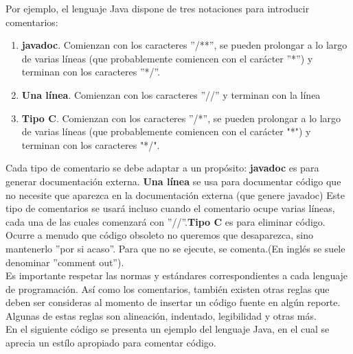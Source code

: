 Por ejemplo, el lenguaje Java dispone de tres notaciones para introducir comentarios:\\

\begin{enumerate}[1)]
	\item \textbf{javadoc}. Comienzan con los caracteres ''/**'', se pueden prolongar a lo largo de varias l\'ineas (que probablemente comiencen con el car\'acter ''*'') y terminan con los caracteres ''*/''.
	
	\item \textbf{Una l\'inea}. Comienzan con los caracteres ''//'' y terminan con la l\'inea
	
	\item \textbf{Tipo C}. Comienzan con los caracteres ''/*'', se pueden prolongar a lo largo de varias l\'ineas (que probablemente comiencen con el car\'acter "*") y terminan con los caracteres "*/".
\end{enumerate}

Cada tipo de comentario se debe adaptar a un prop\'osito: \textbf{javadoc} es para generar documentaci\'on externa. \textbf{Una l\'inea} se usa para documentar c\'odigo que no necesite que aparezca en la documentaci\'on externa (que genere javadoc)
Este tipo de comentarios se usar\'a incluso cuando el comentario ocupe varias l\'ineas, cada una de las cuales comenzar\'a con ''//''.\textbf{Tipo C} es para eliminar c\'odigo. Ocurre a menudo que c\'odigo obsoleto no queremos que desaparezca, sino mantenerlo ''por si acaso''. Para que no se ejecute, se comenta.(En ingl\'es se suele denominar ''comment out'').\\

Es importante respetar las normas y est\'andares correspondientes a cada lenguaje de programaci\'on. As\'i como los comentarios, tambi\'en existen otras reglas que deben ser consideras al momento de insertar un c\'odigo fuente en alg\'un reporte. Algunas de estas reglas son alineaci\'on, indentado, legibilidad y otras m\'as.\\

En el siguiente c\'odigo se presenta un ejemplo del lenguaje Java, en el cual se aprecia un est\'ilo apropiado para comentar c\'odigo.

